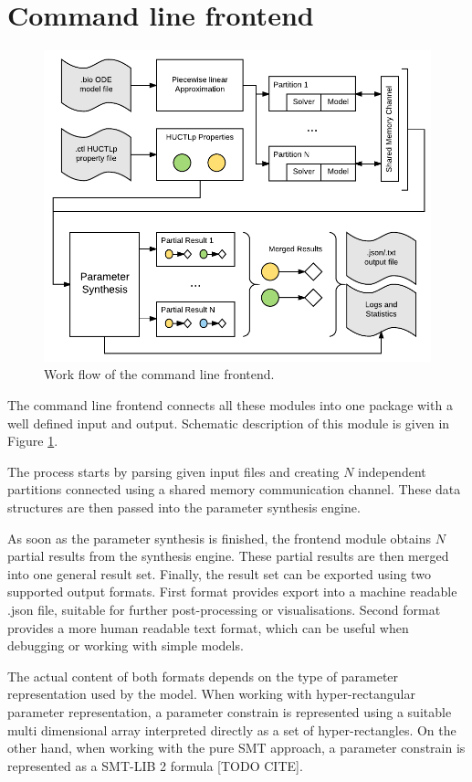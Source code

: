 \section{Command line frontend}

\begin{figure}[]
	\centering
	\includegraphics[scale=0.9]{media/cli_workflow.pdf}
	\caption{Work flow of the command line frontend. }
	\label{fig:cli_workflow}
\end{figure}

The command line frontend connects all these modules into one package with a well defined input and output. Schematic description of this module is given in Figure \ref{fig:cli_workflow}.

The process starts by parsing given input files and creating $N$ independent partitions connected using a shared memory communication channel. These data structures are then passed into the parameter synthesis engine.

As soon as the parameter synthesis is finished, the frontend module obtains $N$ partial results from the synthesis engine. These partial results are then merged into one general result set. Finally, the result set can be exported using two supported output formats. First format provides export into a machine readable .json file, suitable for further post-processing or visualisations. Second format provides a more human readable text format, which can be useful when debugging or working with simple models.

The actual content of both formats depends on the type of parameter representation used by the model. When working with hyper-rectangular parameter representation, a parameter constrain is represented using a suitable multi dimensional array interpreted directly as a set of hyper-rectangles. On the other hand, when working with the pure SMT approach, a parameter constrain is represented as a SMT-LIB 2 formula [TODO CITE].

